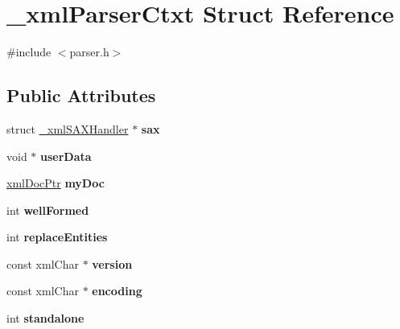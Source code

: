 \hypertarget{struct__xmlParserCtxt}{
\section{\_\-xmlParserCtxt Struct Reference}
\label{struct__xmlParserCtxt}
}


{\ttfamily \#include $<$parser.h$>$}

\subsection*{Public Attributes}
\begin{DoxyCompactItemize}
\item 
\hypertarget{struct__xmlParserCtxt_a6461422cb3f71bd1eeea538a7c72b56e}{
struct \hyperlink{struct__xmlSAXHandler}{\_\-xmlSAXHandler} $\ast$ {\bfseries sax}}
\label{struct__xmlParserCtxt_a6461422cb3f71bd1eeea538a7c72b56e}

\item 
\hypertarget{struct__xmlParserCtxt_ae23873a107a9dc280a0a4daba0f21671}{
void $\ast$ {\bfseries userData}}
\label{struct__xmlParserCtxt_ae23873a107a9dc280a0a4daba0f21671}

\item 
\hypertarget{struct__xmlParserCtxt_a7058431b5a7781f3ecb400a0687b35de}{
\hyperlink{struct__xmlDoc}{xmlDocPtr} {\bfseries myDoc}}
\label{struct__xmlParserCtxt_a7058431b5a7781f3ecb400a0687b35de}

\item 
\hypertarget{struct__xmlParserCtxt_a304fdc65a808cab0e5057770375d1809}{
int {\bfseries wellFormed}}
\label{struct__xmlParserCtxt_a304fdc65a808cab0e5057770375d1809}

\item 
\hypertarget{struct__xmlParserCtxt_a1649ee3fa54a9a0a666f82c5738faf80}{
int {\bfseries replaceEntities}}
\label{struct__xmlParserCtxt_a1649ee3fa54a9a0a666f82c5738faf80}

\item 
\hypertarget{struct__xmlParserCtxt_ac3b0f4294a275545b1305218d90d02ea}{
const xmlChar $\ast$ {\bfseries version}}
\label{struct__xmlParserCtxt_ac3b0f4294a275545b1305218d90d02ea}

\item 
\hypertarget{struct__xmlParserCtxt_a8ab949233a869865002ede3ef6c1a452}{
const xmlChar $\ast$ {\bfseries encoding}}
\label{struct__xmlParserCtxt_a8ab949233a869865002ede3ef6c1a452}

\item 
\hypertarget{struct__xmlParserCtxt_ad92c2a15082cf72806f8b6499b12b4d5}{
int {\bfseries standalone}}
\label{struct__xmlParserCtxt_ad92c2a15082cf72806f8b6499b12b4d5}


\end{DoxyCompactItemize}
